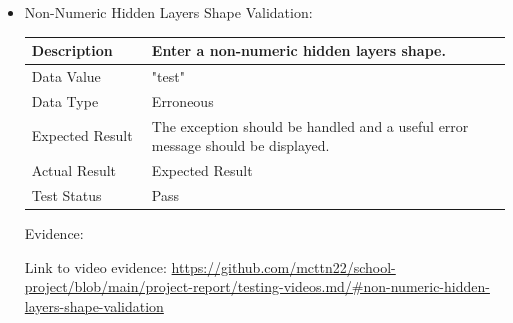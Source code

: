 \documentclass[./project-report/src/latex/project-report.tex]{subfiles}
\begin{document}
\begin{itemize}
\begin{itemize}
        \item Non-Numeric Hidden Layers Shape Validation: \newline\newline
			\begin{tabular}{|p{0.25\linewidth}|p{0.75\linewidth}|}
				\hline
				Description & Enter a non-numeric hidden layers shape. \\
				\hline
				Data Value & "test" \\
				\hline
				Data Type & Erroneous \\
				\hline
				Expected Result & The exception should be handled and a useful error message should be displayed. \\
				\hline
				Actual Result & Expected Result \\
				\hline
				Test Status & Pass \\
				\hline
			\end{tabular}

			\vspace{5mm}

			Evidence:
			\begin{figure}[h!]
			\centering
			\end{figure}

			\begin{sloppypar}
			Link to video evidence: \url{https://github.com/mcttn22/school-project/blob/main/project-report/testing-videos.md/#non-numeric-hidden-layers-shape-validation}
			\end{sloppypar}
	
			\pagebreak


\end{itemize}
\end{itemize}
\end{document}
